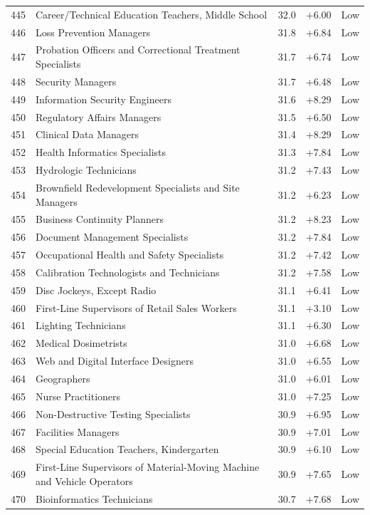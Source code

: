{\begin{longtable}{rp{7cm}ccc}
445 & Career/Technical Education Teachers, Middle School & 32.0 & +6.00 & Low \\
446 & Loss Prevention Managers & 31.8 & +6.84 & Low \\
447 & Probation Officers and Correctional Treatment Specialists & 31.7 & +6.74 & Low \\
448 & Security Managers & 31.7 & +6.48 & Low \\
449 & Information Security Engineers & 31.6 & +8.29 & Low \\
450 & Regulatory Affairs Managers & 31.5 & +6.50 & Low \\
451 & Clinical Data Managers & 31.4 & +8.29 & Low \\
452 & Health Informatics Specialists & 31.3 & +7.84 & Low \\
453 & Hydrologic Technicians & 31.2 & +7.43 & Low \\
454 & Brownfield Redevelopment Specialists and Site Managers & 31.2 & +6.23 & Low \\
455 & Business Continuity Planners & 31.2 & +8.23 & Low \\
456 & Document Management Specialists & 31.2 & +7.84 & Low \\
457 & Occupational Health and Safety Specialists & 31.2 & +7.42 & Low \\
458 & Calibration Technologists and Technicians & 31.2 & +7.58 & Low \\
459 & Disc Jockeys, Except Radio & 31.1 & +6.41 & Low \\
460 & First-Line Supervisors of Retail Sales Workers & 31.1 & +3.10 & Low \\
461 & Lighting Technicians & 31.1 & +6.30 & Low \\
462 & Medical Dosimetrists & 31.0 & +6.68 & Low \\
463 & Web and Digital Interface Designers & 31.0 & +6.55 & Low \\
464 & Geographers & 31.0 & +6.01 & Low \\
465 & Nurse Practitioners & 31.0 & +7.25 & Low \\
466 & Non-Destructive Testing Specialists & 30.9 & +6.95 & Low \\
467 & Facilities Managers & 30.9 & +7.01 & Low \\
468 & Special Education Teachers, Kindergarten & 30.9 & +6.10 & Low \\
469 & First-Line Supervisors of Material-Moving Machine and Vehicle Operators & 30.9 & +7.65 & Low \\
470 & Bioinformatics Technicians & 30.7 & +7.68 & Low \\

\end{longtable}}
